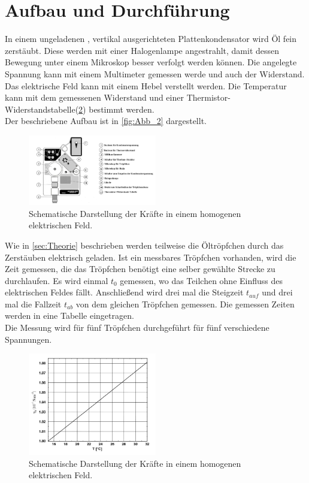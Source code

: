 \section{Aufbau und Durchführung}
\label{sec:Durchführung}
In einem ungeladenen , vertikal ausgerichteten Plattenkondensator wird Öl fein
zerstäubt. Diese werden mit einer Halogenlampe angestrahlt, damit dessen Bewegung
unter einem Mikroskop besser verfolgt werden können. Die angelegte Spannung kann mit
einem Multimeter gemessen werde und auch der Widerstand. Das elektrische Feld kann 
mit einem Hebel verstellt werden. Die Temperatur kann mit dem gemessenen Widerstand 
und einer Thermistor-Widerstandstabelle(\ref{fig:Abb_3}) bestimmt werden.\\
Der beschriebene Aufbau ist in \autoref{fig:Abb_2} dargestellt.
\begin{figure}[H]
    \centering
    \includegraphics[width=0.5\textwidth]{Abbildungen/Abb_2.png}
    \caption {Schematische Darstellung der Kräfte in einem homogenen elektrischen Feld\cite[1]{V503}.}
    \label{fig:Abb_2}
\end{figure}
Wie in \autoref{sec:Theorie} beschrieben werden teilweise die Öltröpfchen durch das Zerstäuben 
elektrisch geladen. Ist ein messbares Tröpfchen vorhanden, wird die Zeit gemessen, die 
das Tröpfchen benötigt eine selber gewählte Strecke zu durchlaufen.
Es wird einmal $t_0$ gemessen, wo das Teilchen ohne Einfluss des elektrischen Feldes fällt.
Anschließend wird drei mal die Steigzeit $t_{auf}$ und drei mal die Fallzeit $t_{ab}$ von 
dem gleichen Tröpfchen gemessen. Die gemessen Zeiten werden in eine Tabelle eingetragen.\\
Die Messung wird für fünf Tröpfchen durchgeführt für fünf verschiedene Spannungen.
\begin{figure}[H]
    \centering
    \includegraphics[width=0.5\textwidth]{Abbildungen/Abb_3.png}
    \caption {Schematische Darstellung der Kräfte in einem homogenen elektrischen Feld\cite[1]{V503}.}
    \label{fig:Abb_3}
\end{figure}